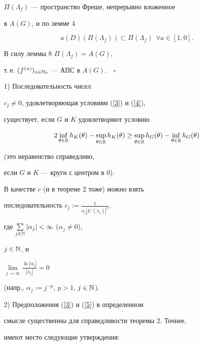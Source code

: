 $\Pi(\Lambda_f)$ --- пространство Фреше, непрерывно вложенное


в $A(G)$, и по лемме 4


$$


a(D)(\Pi(\Lambda_f))\subset \Pi(\Lambda_f)\ \ \forall a\in [1,0].


$$


В силу леммы 8 \cite{MEL1} $\Pi(\Lambda_f)=A(G)$,


т.\,е. $(f^{(n)})_{n\in\Bbb N_0}$ --- АПС в $A(G)$.$\quad\square$





\begin{note}


1) Последовательность чисел


$c_j\ne 0$, удовлетворяющая условиям (\ref{3}) и (\ref{4}),


существует, если $G$ и $K$ удовлетворяют условию


$$


2\inf\limits_{\theta\in\Bbb R}h_K(\theta)


-\sup\limits_{\theta\in\Bbb R}h_K(\theta)\ge


\sup\limits_{\theta\in\Bbb R}h_G(\theta)-


\inf\limits_{\theta\in\Bbb R}h_G(\theta)


$$


(это неравенство справедливо,


если $G$ и $K$ --- круги с центром в $0$).


В качестве $c$ (и в теореме 2 тоже) можно взять


последовательность $c_j:=


\frac{1}{\alpha_j|L'(\lambda_j)|^2}$,


где $\sum\limits_{j\in\Bbb N}|\alpha_j|<\infty$ ($\alpha_j\ne 0$),


$j\in\Bbb N$, и


$\lim\limits_{j\to\infty}\frac{\ln |\alpha_j|}{|\lambda_j|}=0$


(напр., $\alpha_j:=j^{-p}$, $p>1$, $j\in\Bbb N$).





2) Предположения (\ref{3}) и (\ref{5}) в определенном


смысле существенны для справедливости теоремы 2. Точнее,


имеют место следующие утверждения:






\end{note}
